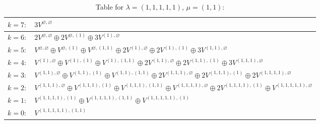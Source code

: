 \documentclass[a4paper,12pt]{article}
\begin{document}
\renewcommand{\arraystretch}{1.6} 
\begin{table}[H]
\centering
\caption{Table for $\lambda = (1, 1, 1, 1, 1)$, $\mu = (1, 1)$:}
\begin{tabular}{|>{\centering\arraybackslash}p{15cm}|}
\hline
 $k = 7: \quad 3 V^{\varnothing, \varnothing} $ \\ \hline
 $k = 6: \quad 2 V^{\varnothing, \varnothing} \oplus 2 V^{\varnothing, (1)} \oplus 3 V^{(1), \varnothing} $ \\ \hline
 $k = 5: \quad V^{\varnothing, \varnothing} \oplus V^{\varnothing, (1)} \oplus V^{\varnothing, (1, 1)} \oplus 2 V^{(1), \varnothing} \oplus 2 V^{(1), (1)} \oplus 3 V^{(1, 1), \varnothing} $ \\ \hline
 $k = 4: \quad V^{(1), \varnothing} \oplus V^{(1), (1)} \oplus V^{(1), (1, 1)} \oplus 2 V^{(1, 1), \varnothing} \oplus 2 V^{(1, 1), (1)} \oplus 3 V^{(1, 1, 1), \varnothing} $ \\ \hline
 $k = 3: \quad V^{(1, 1), \varnothing} \oplus V^{(1, 1), (1)} \oplus V^{(1, 1), (1, 1)} \oplus 2 V^{(1, 1, 1), \varnothing} \oplus 2 V^{(1, 1, 1), (1)} \oplus 2 V^{(1, 1, 1, 1), \varnothing} $ \\ \hline
 $k = 2: \quad V^{(1, 1, 1), \varnothing} \oplus V^{(1, 1, 1), (1)} \oplus V^{(1, 1, 1), (1, 1)} \oplus V^{(1, 1, 1, 1), \varnothing} \oplus 2 V^{(1, 1, 1, 1), (1)} \oplus V^{(1, 1, 1, 1, 1), \varnothing} $ \\ \hline
 $k = 1: \quad V^{(1, 1, 1, 1), (1)} \oplus V^{(1, 1, 1, 1), (1, 1)} \oplus V^{(1, 1, 1, 1, 1), (1)} $ \\ \hline
 $k = 0: \quad V^{(1, 1, 1, 1, 1), (1, 1)} $ \\ \hline
\end{tabular}
\end{table}
\end{document}

